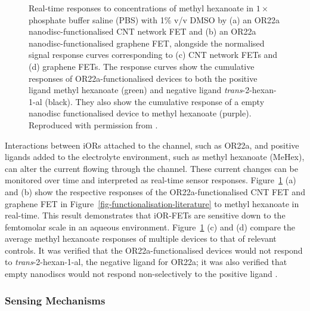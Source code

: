 \documentclass[
  a4paper,
]{scrbook}
\begin{document}
\begin{figure}
\caption{\label{fig-iOR-sensing-literature}Real-time responses to
concentrations of methyl hexanoate in \(1 \times\) phosphate buffer
saline (PBS) with 1\% v/v DMSO by (a) an OR22a nanodisc-functionalised
CNT network FET and (b) an OR22a nanodisc-functionalised graphene FET,
alongside the normalised signal response curves corresponding to (c) CNT
network FETs and (d) graphene FETs. The response curves show the
cumulative responses of OR22a-functionalised devices to both the
positive ligand methyl hexanoate (green) and negative ligand
\emph{trans}-2-hexan-1-al (black). They also show the cumulative
response of a empty nanodisc functionalised device to methyl hexanoate
(purple). Reproduced with permission from
\autocite{Murugathas2019a,Murugathas2020}.}

\end{figure}

Interactions between iORs attached to the channel, such as OR22a, and
positive ligands added to the electrolyte environment, such as methyl
hexanoate (MeHex), can alter the current flowing through the channel.
These current changes can be monitored over time and interpreted as
real-time sensor responses. Figure~\ref{fig-iOR-sensing-literature} (a)
and (b) show the respective responses of the OR22a-functionalised CNT
FET and graphene FET in Figure~\ref{fig-functionalisation-literature} to
methyl hexanoate in real-time. This result demonstrates that iOR-FETs
are sensitive down to the femtomolar scale in an aqueous environment.
Figure~\ref{fig-iOR-sensing-literature} (c) and (d) compare the average
methyl hexanoate responses of multiple devices to that of relevant
controls. It was verified that the OR22a-functionalised devices would
not respond to \emph{trans}-2-hexan-1-al, the negative ligand for OR22a;
it was also verified that empty nanodiscs would not respond
non-selectively to the positive ligand
\autocite{Murugathas2019a,Murugathas2020}.

\hypertarget{sensing-mechanisms}{%
\subsubsection*{Sensing Mechanisms}\label{sensing-mechanisms}}
\end{document}
